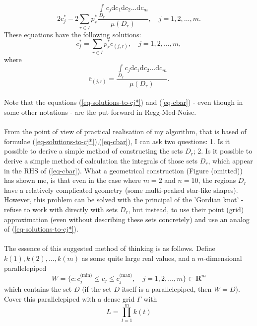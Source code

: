 \begin{equation}
2 c_{j}^{*} - 2 \sum\limits_{r \in I} p_{r}^{*}\frac{\int\limits_{D_{r}} c_{j}\mathrm{d}c_{1}\mathrm{d}c_{2}\dots\mathrm{d}c_{m}}{\mu(D_{r})} , \quad j = 1,2,\dots,m.
\end{equation}
These equations have the following solutions:
\begin{equation}
c_{j}^{*} = \sum\limits_{r \in I} p_{r}^{*} \bar{c}_{(j,r)}, \quad j = 1,2,\dots,m, \label{eq-solutions-to-cj*}
\end{equation}
where
\begin{equation}
\bar{c}_{(j,r)} = \frac{\int\limits_{D_{r}} c_{j}\mathrm{d}c_{1}\mathrm{d}c_{2}\dots\mathrm{d}c_{m}}{\mu(D_{r})}. \label{eq-cbar}
\end{equation}
\\
Note that the equations (\ref{eq-solutions-to-cj*}) and (\ref{eq-cbar}) - even though in some other notations - are the put forward in Regg-Med-Noise.\\
\\
From the point of view of practical realisation of my algorithm, that is based of formulae (\ref{eq-solutions-to-cj*}),(\ref{eq-cbar}), I can ask two questions: 1. Is it possible to derive a simple method of constructing the sets $D_{r}$; 2. Is it possible to derive a simple method of calculation the integrals of those sets $D_{r}$, which appear in the RHS of (\ref{eq-cbar}). What a geometrical construction (Figure (omitted)) has shown me, is that even in the case where $m=2$ and $n=10$, the regions $D_{r}$ have a relatively complicated geometry (some multi-peaked star-like shapes). However, this problem can be solved with the principal of the 'Gordian knot' - refuse to work with directly with sets $D_{r}$, but instead, to use their point (grid) approximation (even without describing these sets concretely) and use an analog of (\ref{eq-solutions-to-cj*}).\\
\\
The essence of this suggested method of thinking is as follows. Define $k(1),k(2),\dots,k(m)$ as some quite large real values, and a $m$-dimensional parallelepiped
\begin{equation}
W=\{ c:c_{j}^{(\text{min)}} \leq c_{j} \leq c_{j}^{(\text{max)}}, \quad j=1,2,\dots,m \}\subset \boldsymbol{R}^{m}
\end{equation}
which contains the set $D$ (if the set $D$ itself is a parallelepiped, then $W=D$). Cover this parallelepiped with a dense grid $\Gamma$ with
\begin{equation}
L = \prod\limits_{t=1}^{m}k(t)
\end{equation}
